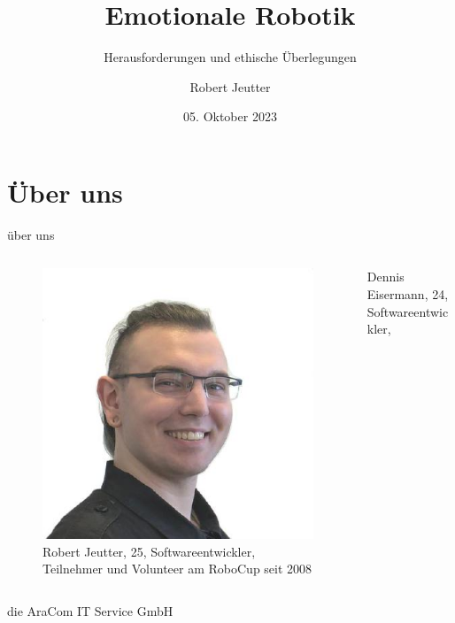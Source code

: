 \documentclass[aspectratio=169]{beamer}
\title{Emotionale Robotik}
\subtitle{Herausforderungen und ethische Überlegungen}
\author{Robert Jeutter}
\date{05. Oktober 2023}
\begin{document}
\maketitle

\section{Über uns}
\begin{frame}{über uns}
  \begin{columns}
    \begin{column}{0.45\textwidth}
      \begin{figure}[h]
        \centering
        \includegraphics[width=\linewidth]{images/robert_jeutter.jpeg}
        Robert Jeutter, 25, Softwareentwickler, Teilnehmer und Volunteer am RoboCup seit 2008
      \end{figure}
    \end{column}
    \begin{column}{0.45\textwidth}
      Dennis Eisermann, 24, Softwareentwickler,
    \end{column}
  \end{columns}
\end{frame}
\begin{frame}{die AraCom IT Service GmbH}

\end{frame}
\end{document}
